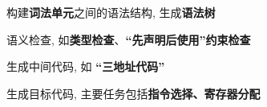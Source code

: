 \begin{frame}{}
  \begin{center}
     构建{\bf 词法单元}之间的语法结构, 生成{\bf 语法树}

    \vspace{0.80cm}
  \end{center}
\end{frame}

\begin{frame}{}
  \begin{center}
     语义检查, 如{\bf 类型检查}、{\bf ``先声明后使用''约束检查}

    \vspace{0.80cm}
  \end{center}
\end{frame}

\begin{frame}{}
  \begin{center}
     生成中间代码, 如 {\bf ``三地址代码''}

    \vspace{0.80cm}
  \end{center}
\end{frame}

\begin{frame}{}
  \begin{center}

    \vspace{0.80cm}
  \end{center}
\end{frame}

\begin{frame}{}
  \begin{center}
     生成目标代码, 主要任务包括{\bf 指令选择、寄存器分配}

    \vspace{0.80cm}
  \end{center}
\end{frame}

